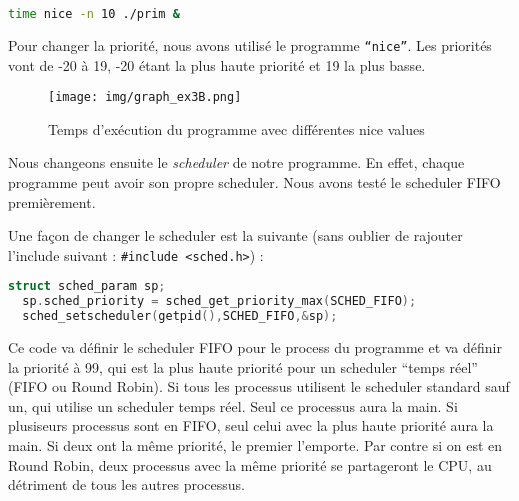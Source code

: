 \begin{lstlisting}[language=bash]
  time nice -n 10 ./prim &
\end{lstlisting}

Pour changer la priorité, nous avons utilisé le programme \texttt{``nice''}. Les priorités vont de -20 à 19, -20 étant la plus haute priorité et 19 la plus basse.

\begin{figure}[h]
  \centering
    \texttt{[image: img/graph\_ex3B.png]}
  \caption{Temps d'exécution du programme avec différentes nice values}
  \label{graph1}
\end{figure}

Nous changeons ensuite le \textit{scheduler} de notre programme. En effet, chaque programme peut avoir son propre scheduler. Nous avons testé le scheduler FIFO premièrement.

Une façon de changer le scheduler est la suivante (sans oublier de rajouter l'include suivant : \texttt{\#include <sched.h>}) :

\begin{lstlisting}[language=c]
  struct sched_param sp;
  sp.sched_priority = sched_get_priority_max(SCHED_FIFO);
  sched_setscheduler(getpid(),SCHED_FIFO,&sp);
\end{lstlisting}

Ce code va définir le scheduler FIFO pour le process du programme et va définir la priorité à 99, qui est la plus haute priorité pour un scheduler ``temps réel'' (FIFO ou Round Robin).
Si tous les processus utilisent le scheduler standard sauf un, qui utilise un scheduler temps réel. Seul ce processus aura la main. Si plusiseurs processus sont en FIFO, seul celui avec la plus haute priorité aura la main. Si deux ont la même priorité, le premier l'emporte. Par contre si on est en Round Robin, deux processus avec la même priorité se partageront le CPU, au détriment de tous les autres processus.





